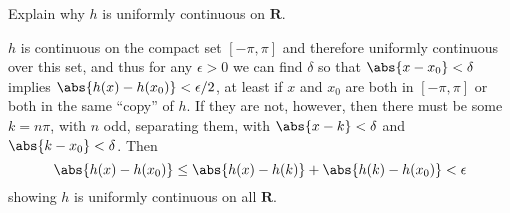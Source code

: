 \begin{exercise}
Explain why \(h\) is uniformly continuous on \(\mathbf{R}\).
\end{exercise}
\begin{solution}
\(h\) is continuous on the compact set \([-\pi, \pi]\) and therefore uniformly continuous over this set, and thus for any \(\epsilon> 0\) we can find \(\delta\) so that \(\abs{x - x_0} < \delta\) implies \(\abs{h(x) - h(x_0)} < \epsilon / 2\), at least if \(x\) and \(x_0\) are both in \([-\pi, \pi]\) or both in the same ``copy'' of \(h\). If they are not, however, then there must be some \(k = n\pi\), with \(n\) odd, separating them, with \(\abs{x - k} < \delta\) and \(
    \abs{k - x_0} < \delta\). Then
\[\abs{h(x) - h(x_0)} \leq \abs{h(x) - h(k)} + \abs{h(k) - h(x_0)} < \epsilon\]
showing \(h\) is uniformly continuous on all \(\mathbf{R}\).
\end{solution}
